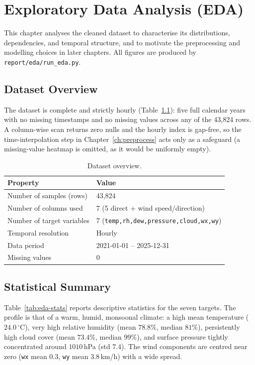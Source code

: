 \documentclass[12pt,a4paper,oneside]{report}
\begin{document}
\chapter{Exploratory Data Analysis (EDA)}
\label{ch:eda}

This chapter analyses the cleaned dataset to characterise its distributions,
dependencies, and temporal structure, and to motivate the preprocessing and
modelling choices in later chapters. All figures are produced by
\texttt{report/eda/run\_eda.py}.

\section{Dataset Overview}
The dataset is complete and strictly hourly (Table~\ref{tab:eda-overview}): five
full calendar years with no missing timestamps and no missing values across any of
the 43{,}824 rows. A column-wise scan returns zero nulls and the hourly index is
gap-free, so the time-interpolation step in Chapter~\ref{ch:preprocess} acts only as
a safeguard (a missing-value heatmap is omitted, as it would be uniformly empty).

\begin{table}[H]
\centering
\caption{Dataset overview.}
\label{tab:eda-overview}
\begin{tabular}{ll}
\toprule
\textbf{Property} & \textbf{Value} \\
\midrule
Number of samples (rows)   & 43{,}824 \\
Number of columns used     & 7 (5 direct + wind speed/direction) \\
Number of target variables & 7 (\texttt{temp,rh,dew,pressure,cloud,wx,wy}) \\
Temporal resolution        & Hourly \\
Data period                & 2021-01-01 -- 2025-12-31 \\
Missing values             & 0 \\
\bottomrule
\end{tabular}
\end{table}

\section{Statistical Summary}
Table~\ref{tab:eda-stats} reports descriptive statistics for the seven targets. The
profile is that of a warm, humid, monsoonal climate: a high mean temperature
($24.0\,^\circ$C), very high relative humidity (mean $78.8\%$, median $81\%$),
persistently high cloud cover (mean $73.4\%$, median $99\%$), and surface pressure
tightly concentrated around $1010$\,hPa (std $7.4$). The wind components are centred
near zero (\texttt{wx} mean $0.3$, \texttt{wy} mean $3.8$\,km/h) with a wide spread.
\end{document}
